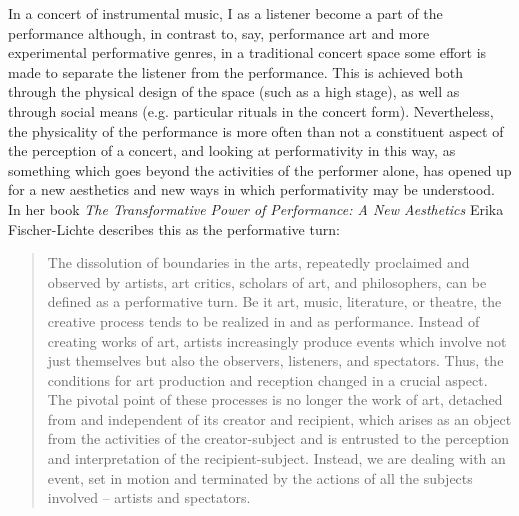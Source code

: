 \documentclass[11pt]{article}
\begin{document}
In a concert of instrumental music, I as a listener become a part of
the performance although, in contrast to, say, performance art and
more experimental performative genres, in a traditional concert space
some effort is made to separate the listener from the
performance. This is achieved both through the physical design of the
space (such as a high stage), as well as through social means
(e.g. particular rituals in the concert form). Nevertheless, the
physicality of the performance is more often than not a constituent
aspect of the perception of a concert, and looking at performativity
in this way, as something which goes beyond the activities of the
performer alone, has opened up for a new aesthetics and new ways in
which performativity may be understood. In her book \emph{The
  Transformative Power of Performance: A New Aesthetics} Erika
Fischer-Lichte describes this as the performative turn:
\begin{quote}
  The dissolution of boundaries in the arts, repeatedly proclaimed and
  observed by artists, art critics, scholars of art, and philosophers,
  can be defined as a performative turn. Be it art, music, literature,
  or theatre, the creative process tends to be realized in and as
  performance. Instead of creating works of art, artists increasingly
  produce events which involve not just themselves but also the
  observers, listeners, and spectators. Thus, the conditions for art
  production and reception changed in a crucial aspect. The pivotal
  point of these processes is no longer the work of art, detached from
  and independent of its creator and recipient, which arises as an
  object from the activities of the creator-subject and is entrusted
  to the perception and interpretation of the
  recipient-subject. Instead, we are dealing with an event, set in
  motion and terminated by the actions of all the subjects involved –
  artists and spectators. \citep[p. 23]{FischerLichte2008} 
\end{quote}
\end{document}
